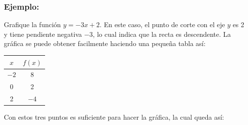 \documentclass[10pt,twoside]{article}
\begin{document}
\subsubsection{Ejemplo:} 
\begin{minipage}{0.45\textwidth}
Grafique la función $ y=-3x+2 $. En este caso, el punto de corte con el eje $ y $ es 2 y tiene pendiente negativa $ -3 $, lo cual indica que la recta es descendente. La gráfica se puede obtener facilmente haciendo una pequeña tabla así:\\

\begin{tabular}{|c|c|}\hline
$x$&$ f(x) $\\ \hline
$ -2 $ & 8\\ \hline
$ 0 $ & 2\\ \hline
2 & $ -4 $\\\hline
\end{tabular}
\vspace{12pt}

Con estos tres puntos es suficiente para hacer la gráfica, la cual queda así:
\end{minipage}\hfill
\begin{minipage}{0.45\textwidth}
\end{minipage}
\end{document}
